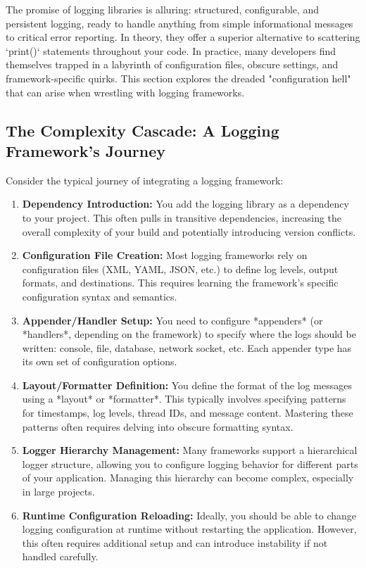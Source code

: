 \documentclass{article}
\begin{document}
{{{{The promise of logging libraries is alluring: structured, configurable, and persistent logging, ready to handle anything from simple informational messages to critical error reporting. In theory, they offer a superior alternative to scattering `print()` statements throughout your code. In practice, many developers find themselves trapped in a labyrinth of configuration files, obscure settings, and framework-specific quirks. This section explores the dreaded "configuration hell" that can arise when wrestling with logging frameworks.

\subsection*{The Complexity Cascade: A Logging Framework's Journey}

Consider the typical journey of integrating a logging framework:

\begin{enumerate}
    \item \textbf{Dependency Introduction:} You add the logging library as a dependency to your project. This often pulls in transitive dependencies, increasing the overall complexity of your build and potentially introducing version conflicts.
    \item \textbf{Configuration File Creation:} Most logging frameworks rely on configuration files (XML, YAML, JSON, etc.) to define log levels, output formats, and destinations. This requires learning the framework's specific configuration syntax and semantics.
    \item \textbf{Appender/Handler Setup:}  You need to configure *appenders* (or *handlers*, depending on the framework) to specify where the logs should be written: console, file, database, network socket, etc. Each appender type has its own set of configuration options.
    \item \textbf{Layout/Formatter Definition:} You define the format of the log messages using a *layout* or *formatter*.  This typically involves specifying patterns for timestamps, log levels, thread IDs, and message content. Mastering these patterns often requires delving into obscure formatting syntax.
    \item \textbf{Logger Hierarchy Management:}  Many frameworks support a hierarchical logger structure, allowing you to configure logging behavior for different parts of your application.  Managing this hierarchy can become complex, especially in large projects.
    \item \textbf{Runtime Configuration Reloading:} Ideally, you should be able to change logging configuration at runtime without restarting the application. However, this often requires additional setup and can introduce instability if not handled carefully.
\end{enumerate}

}}}}
\end{document}
